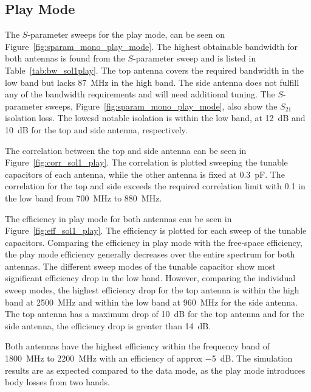 \FloatBarrier
\subsection{Play Mode}
The $S$-parameter sweeps for the play mode, can be seen on Figure~\ref{fig:sparam_mono_play_mode}. The highest obtainable bandwidth for both antennas is found from the $S$-parameter sweep and is listed in Table~\ref{tab:bw_sol1play}. The top antenna covers the required bandwidth in the low band but lacks \SI{87}{MHz} in the high band. The side antenna does not fulfill any of the bandwidth requirements and will need additional tuning. The $S$-parameter sweeps, Figure~\ref{fig:sparam_mono_play_mode}, also show the $S_{21}$ isolation loss. The lowesd notable isolation is within the low band, at \SI{12}{dB} and \SI{10}{dB} for the top and side antenna, respectively.       

The correlation between the top and side antenna can be seen in Figure~\ref{fig:corr_sol1_play}. The correlation is plotted sweeping the tunable capacitors of each antenna, while the other antenna is fixed at \SI{0.3}{pF}. The correlation for the top and side exceeds the required correlation limit with \num{0.1} in the low band from \SI{700}{MHz} to \SI{880}{MHz}.

The efficiency in play mode for both antennas can be seen in Figure~\ref{fig:eff_sol1_play}. The efficiency is plotted for each sweep of the tunable capacitors. Comparing the efficiency in play mode with the free-space efficiency, the play mode efficiency generally decreases over the entire spectrum for both antennas. The different sweep modes of the tunable capacitor show most significant efficiency drop in the low band. However, comparing the individual sweep modes, the highest efficiency drop for the top antenna is within the high band at \SI{2500}{MHz} and within the low band at \SI{960}{MHz} for the side antenna. The top antenna has a maximum drop of \SI{10}{dB} for the top antenna and for the side antenna, the efficiency drop is greater than \SI{14}{dB}.

%
Both antennas have the highest efficiency within the frequency band of \SI{1800}{MHz} to \SI{2200}{MHz} with an efficiency of approx \SI{-5}{dB}. 
The simulation results are as expected compared to the data mode, as the play mode introduces body losses from two hands. 

